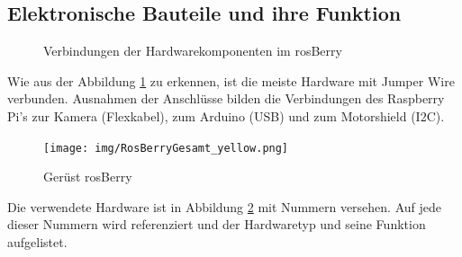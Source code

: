 \documentclass[conference]{IEEEtran}
\begin{document}
	\subsection{Elektronische Bauteile und ihre Funktion}
	\begin{figure} %
		\centering
		\def\svgwidth{9cm}
		
		\caption{Verbindungen der Hardwarekomponenten im rosBerry}
		\label{Hardwarekomponenten}
	\end{figure}
	
	Wie aus der Abbildung \ref{Hardwarekomponenten} zu erkennen, ist die meiste Hardware mit Jumper Wire verbunden.
	Ausnahmen der Anschlüsse bilden die Verbindungen des Raspberry Pi's 
	zur Kamera (Flexkabel), zum Arduino (USB) und zum Motorshield (I2C).
	\\
	
	
	\begin{figure}[!ht]
		\centering
		\texttt{[image: img/RosBerryGesamt\_yellow.png]}
		\caption{Gerüst rosBerry}
		\label{rosBerryGesamt}
	\end{figure}
	
	Die verwendete Hardware ist in Abbildung \ref{rosBerryGesamt} mit Nummern versehen.
	Auf jede dieser Nummern wird referenziert und der Hardwaretyp und 
	seine Funktion aufgelistet.
	
\end{document}
